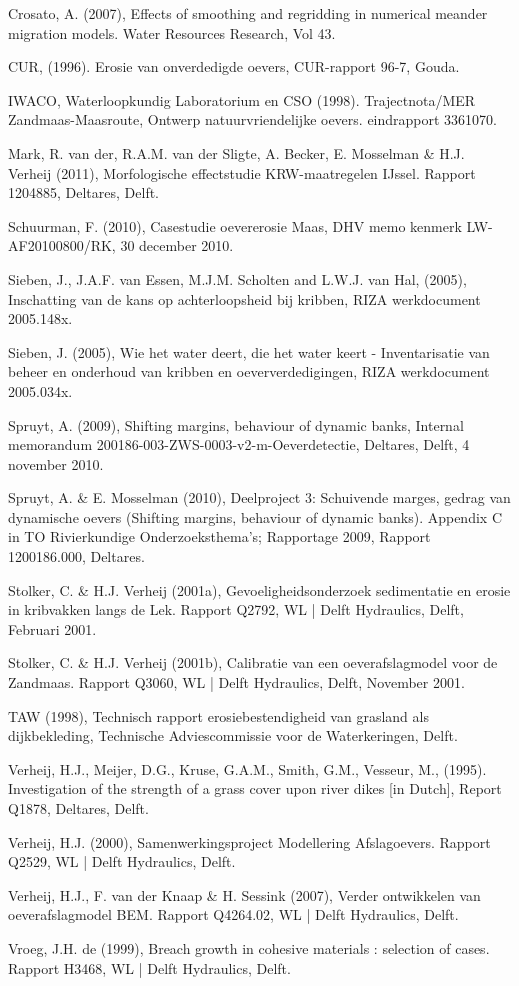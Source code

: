 Crosato, A. (2007), Effects of smoothing and regridding in numerical meander migration models. Water Resources Research, Vol 43.

CUR, (1996). Erosie van onverdedigde oevers, CUR-rapport 96-7, Gouda.

IWACO, Waterloopkundig Laboratorium en CSO (1998). Trajectnota/MER Zandmaas-Maasroute, Ontwerp natuurvriendelijke oevers. eindrapport 3361070.

Mark, R. van der, R.A.M. van der Sligte, A. Becker, E. Mosselman \& H.J. Verheij (2011), Morfologische effectstudie KRW-maatregelen IJssel.
Rapport 1204885, Deltares, Delft.

Schuurman, F. (2010), Casestudie oevererosie Maas, DHV memo kenmerk LW-AF20100800/RK, 30 december 2010.

Sieben, J., J.A.F. van Essen, M.J.M. Scholten and L.W.J. van Hal, (2005), Inschatting van de kans op achterloopsheid bij kribben, RIZA werkdocument 2005.148x.

Sieben, J. (2005), Wie het water deert, die het water keert - Inventarisatie van beheer en onderhoud van kribben en oeververdedigingen, RIZA werkdocument 2005.034x.

Spruyt, A. (2009), Shifting margins, behaviour of dynamic banks, Internal memorandum 200186-003-ZWS-0003-v2-m-Oeverdetectie, Deltares, Delft, 4 november 2010.

Spruyt, A. \& E. Mosselman (2010), Deelproject 3: Schuivende marges, gedrag van dynamische oevers (Shifting margins, behaviour of dynamic banks).
Appendix C in TO Rivierkundige Onderzoeksthema's; Rapportage 2009, Rapport 1200186.000, Deltares.

Stolker, C. \& H.J. Verheij (2001a), Gevoeligheidsonderzoek sedimentatie en erosie in kribvakken langs de Lek. Rapport Q2792, WL | Delft Hydraulics, Delft, Februari 2001.

Stolker, C. \& H.J. Verheij (2001b), Calibratie van een oeverafslagmodel voor de Zandmaas. Rapport Q3060, WL | Delft Hydraulics, Delft, November 2001.

TAW (1998), Technisch rapport erosiebestendigheid van grasland als dijkbekleding, Technische Adviescommissie voor de Waterkeringen, Delft.

Verheij, H.J., Meijer, D.G., Kruse, G.A.M., Smith, G.M., Vesseur, M., (1995). Investigation of the strength of a grass cover upon river dikes [in Dutch], Report Q1878, Deltares, Delft.

Verheij, H.J. (2000), Samenwerkingsproject Modellering Afslagoevers. Rapport Q2529, WL | Delft Hydraulics, Delft.

Verheij, H.J., F. van der Knaap \& H. Sessink (2007), Verder ontwikkelen van oeverafslagmodel BEM. Rapport Q4264.02, WL | Delft Hydraulics, Delft.

Vroeg, J.H. de (1999), Breach growth in cohesive materials : selection of cases. Rapport H3468, WL | Delft Hydraulics, Delft.
